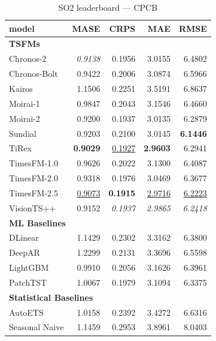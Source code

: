 \begin{table}[H]
\caption{SO2 leaderboard --- CPCB}
\centering
\begin{small}
\begin{tabular}{lrrrr}
\toprule
model & MASE & CRPS & MAE & RMSE \\
\midrule
\multicolumn{5}{l}{\textbf{TSFMs}} \\
Chronos-2 & \textit{0.9138} & 0.1956 & 3.0155 & 6.4802 \\
Chronos-Bolt & 0.9422 & 0.2006 & 3.0874 & 6.5966 \\
Kairos & 1.1506 & 0.2251 & 3.5191 & 6.8637 \\
Moirai-1 & 0.9847 & 0.2043 & 3.1546 & 6.4660 \\
Moirai-2 & 0.9200 & 0.1937 & 3.0135 & 6.2879 \\
Sundial & 0.9203 & 0.2100 & 3.0145 & \textbf{6.1446} \\
TiRex & \textbf{0.9029} & \underline{0.1927} & \textbf{2.9603} & 6.2941 \\
TimesFM-1.0 & 0.9626 & 0.2022 & 3.1300 & 6.4087 \\
TimesFM-2.0 & 0.9318 & 0.1976 & 3.0469 & 6.3677 \\
TimesFM-2.5 & \underline{0.9073} & \textbf{0.1915} & \underline{2.9716} & \underline{6.2223} \\
VisionTS++ & 0.9152 & \textit{0.1937} & \textit{2.9865} & \textit{6.2418} \\
\midrule
\multicolumn{5}{l}{\textbf{ML Baselines}} \\
DLinear & 1.1429 & 0.2302 & 3.3162 & 6.3800 \\
DeepAR & 1.2299 & 0.2131 & 3.3696 & 6.5598 \\
LightGBM & 0.9910 & 0.2056 & 3.1626 & 6.3961 \\
PatchTST & 1.0067 & 0.1979 & 3.1094 & 6.3375 \\
\midrule
\multicolumn{5}{l}{\textbf{Statistical Baselines}} \\
AutoETS & 1.0158 & 0.2392 & 3.4272 & 6.6316 \\
Seasonal Naive & 1.1459 & 0.2953 & 3.8961 & 8.0403 \\
\bottomrule
\end{tabular}
\end{small}
\end{table}